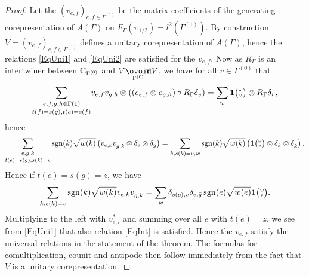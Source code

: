 \begin{proof} Let the $(v_{e,f})_{e,f\in \Gamma^{(1)}}$ be the matrix coefficients of the generating corepresentation of $A(\Gamma)$ on $F_{\Gamma}(\pi_{1/2}) = l^2(\Gamma^{(1)})$. By construction $V = (v_{e,f})_{e,f\in \Gamma^{(1)}}$ defines a unitary corepresentation of $A(\Gamma)$, hence the relations \eqref{EqUni1} and \eqref{EqUni2} are satisfied for the $v_{e,f}$. Now as $R_{\Gamma}$ is an intertwiner between $\mathbb{C}_{\Gamma^{(0)}}$ and $V\Circtv{\Gamma^{(0)}} V$, we have for all $v\in \Gamma^{(0)}$ that \begin{equation}\label{EqMorR}\underset{t(f)=s(g),t(e)=s(f)}{\sum_{e,f,g,h\in \Gamma{(1)}}} v_{e,f}v_{g,h}\otimes \left((e_{e,f}\otimes e_{g,h})\circ R_{\Gamma} \delta_v\right) = \sum_w \mathbf{1}{\tiny {\begin{pmatrix} w\\v\end{pmatrix}}}\otimes R_{\Gamma}\delta_v,\end{equation} hence
\[\underset{t(e)=s(g),s(k)=v}{\sum_{e,g,k}} \operatorname{\mathrm{sgn}}(k)\sqrt{w(k)}\left( v_{e,k}v_{g,\bar{k}} \otimes \delta_e\otimes \delta_{g}\right) =\sum_{k,s(k)=v,w}\operatorname{\mathrm{sgn}}(k)\sqrt{w(k)} \left(\mathbf{1}{\tiny {\begin{pmatrix} w\\v\end{pmatrix}}} \otimes \delta_k\otimes \delta_{\bar{k}}\right).\] Hence if $t(e) = s(g)=z$, we have \[\sum_{k,s(k)=v} \operatorname{\mathrm{sgn}}(k)\sqrt{w(k)} v_{e,k}v_{g,\bar{k}} =\sum_w \delta_{s(e),v} \delta_{e,\bar{g}} \operatorname{\mathrm{sgn}}(e)\sqrt{w(e)}\mathbf{1}{\tiny {\begin{pmatrix} w\\v\end{pmatrix}}}.\] Multiplying to the left with $v_{e,l}^*$ and summing over all $e$ with $t(e) = z$, we see from \eqref{EqUni1} that also relation \eqref{EqInt} is satisfied. Hence the $v_{e,f}$ satisfy the universal relations in the statement of the theorem. The formulas for comultiplication, counit and antipode then follow immediately from the fact that $V$ is a unitary corepresentation.


\end{proof}
